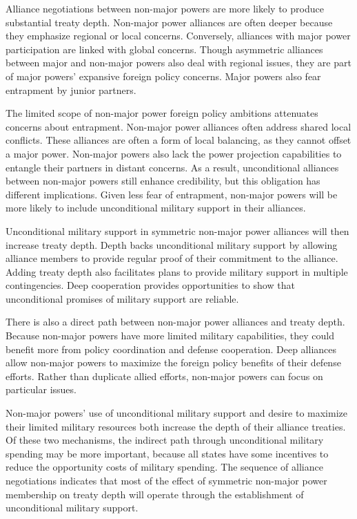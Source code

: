 \documentclass[12pt]{article}
\begin{document}
Alliance negotiations between non-major powers are more likely to produce substantial treaty depth. 
Non-major power alliances are often deeper because they emphasize regional or local concerns.
Conversely, alliances with major power participation are linked with global concerns.
Though asymmetric alliances between major and non-major powers also deal with regional issues, they are part of major powers' expansive foreign policy concerns.  
Major powers also fear entrapment by junior partners. 


The limited scope of non-major power foreign policy ambitions attenuates concerns about entrapment. 
Non-major power alliances often address shared local conflicts. 
These alliances are often a form of local balancing, as they cannot offset a major power. 
Non-major powers also lack the power projection capabilities to entangle their partners in distant concerns. 
As a result, unconditional alliances between non-major powers still enhance credibility, but this obligation has different implications. 
Given less fear of entrapment, non-major powers will be more likely to include unconditional military support in their alliances. 


Unconditional military support in symmetric non-major power alliances will then increase treaty depth. 
Depth backs unconditional military support by allowing alliance members to provide regular proof of their commitment to the alliance. 
Adding treaty depth also facilitates plans to provide military support in multiple contingencies.
Deep cooperation provides opportunities to show that unconditional promises of military support are reliable.  


There is also a direct path between non-major power alliances and treaty depth. 
Because non-major powers have more limited military capabilities, they could benefit more from policy coordination and defense cooperation. 
Deep alliances allow non-major powers to maximize the foreign policy benefits of their defense efforts. 
Rather than duplicate allied efforts, non-major powers can focus on particular issues.


Non-major powers' use of unconditional military support and desire to maximize their limited military resources both increase the depth of their alliance treaties. 
Of these two mechanisms, the indirect path through unconditional military spending may be more important, because all states have some incentives to reduce the opportunity costs of military spending. 
The sequence of alliance negotiations indicates that most of the effect of symmetric non-major power membership on treaty depth will operate through the establishment of unconditional military support. 
\end{document}
